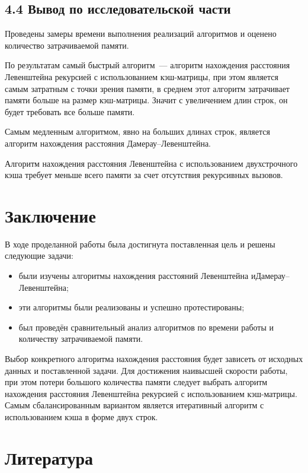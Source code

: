 \documentclass[12pt, a4paper]{report}
\begin{document}
\section*{4.4 Вывод по исследовательской части}

Проведены замеры времени выполнения реализаций алгоритмов и оценено количество затрачиваемой памяти.

По результатам самый быстрый алгоритм~--- алгоритм нахождения расстояния Левенштейна рекурсией с использованием кэш-матрицы, при этом является самым затратным с точки зрения памяти, в среднем этот алгоритм затрачивает памяти больше на размер кэш-матрицы. Значит с увеличением длин строк, он будет требовать все больше памяти.

Самым медленным алгоритмом, явно на больших длинах строк, является алгоритм нахождения расстояния Дамерау--Левенштейна.

Алгоритм нахождения расстояния Левенштейна с использованием двухстрочного кэша требует меньше всего памяти за счет отсутствия рекурсивных вызовов.

\chapter*{Заключение}

В ходе проделанной работы была достигнута поставленная цель и решены следующие задачи:

\begin{itemize}
	\item были изучены алгоритмы нахождения расстояний Левенштейна и\newline Дамерау--Левенштейна;
	\item эти алгоритмы были реализованы и успешно протестированы;
	\item был проведён сравнительный анализ алгоритмов по времени работы и количеству затрачиваемой памяти.
\end{itemize}

Выбор конкретного алгоритма нахождения расстояния будет зависеть от исходных данных и поставленной задачи. Для достижения наивысшей скорости работы, при этом потери большого количества памяти следует выбрать алгоритм нахождения расстояния Левенштейна рекурсией с использованием кэш-матрицы. Самым сбалансированным вариантом является итеративный алгоритм с использованием кэша в форме двух строк.

\chapter*{Литература}
\end{document}
